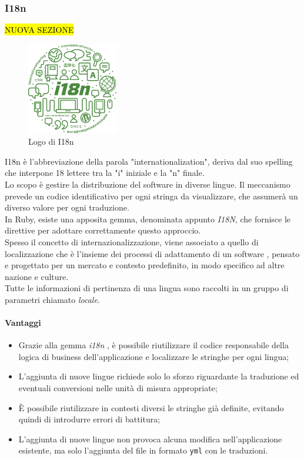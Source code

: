 \subsubsection{I18n}
	\hl{ NUOVA SEZIONE}
	\begin{figure}[H]
		\begin{center}
			\includegraphics[width=4cm]{Pics/i8n-logo.png}
			\caption{Logo di I18n}
			\label{fig:I18NLogo}
		\end{center}
	\end{figure}
	I18n è l'abbreviazione della parola "internationalization", deriva dal suo spelling che interpone 18 lettere tra la "i" iniziale e la "n" finale. \\ 
	Lo scopo è gestire la distribuzione del software in diverse lingue. Il meccanismo prevede un codice identificativo per ogni stringa da visualizzare, che assumerà un diverso valore per ogni traduzione. \\
	In Ruby, esiste una apposita gemma, denominata appunto \textit{I18N}, che fornisce le direttive per adottare correttamente questo approccio. \\
	Spesso il concetto di internazionalizzazione, viene associato a quello di localizzazione che è l'insieme dei processi di adattamento di un software , pensato e progettato per un mercato e contesto predefinito, in modo specifico ad altre nazione e culture. \\
	Tutte le informazioni di pertinenza di una lingua sono raccolti in un gruppo di parametri chiamato \textit{locale}.
\paragraph{Vantaggi}
	\begin{itemize}
		\item Grazie alla gemma \textit{i18n} , è possibile riutilizzare il codice responsabile della logica di business dell'applicazione e localizzare le stringhe per ogni lingua;
		\item L'aggiunta di nuove lingue richiede solo lo sforzo riguardante la traduzione ed eventuali conversioni nelle unità di misura appropriate;
		\item È possibile riutilizzare in contesti diversi le stringhe già definite, evitando quindi di introdurre errori di battitura;
		\item L'aggiunta di nuove lingue non provoca alcuna modifica nell'applicazione esistente, ma solo l'aggiunta del file in formato \texttt{yml} con le traduzioni.
	\end{itemize}
